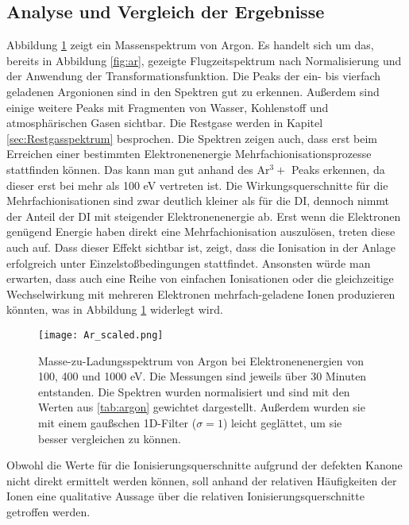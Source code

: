 \subsection{Analyse und Vergleich der Ergebnisse}
Abbildung \ref{fig:ar_scaled} zeigt ein Massenspektrum von Argon. Es handelt sich um das, bereits in Abbildung \ref{fig:ar}, gezeigte Flugzeitspektrum nach Normalisierung und der Anwendung der Transformationsfunktion. Die Peaks der ein- bis vierfach geladenen Argonionen sind in den Spektren gut zu erkennen. Außerdem sind einige weitere Peaks mit Fragmenten von Wasser, Kohlenstoff und atmosphärischen Gasen sichtbar. Die Restgase werden in Kapitel \ref{sec:Restgasspektrum} besprochen. Die Spektren zeigen auch, dass erst beim Erreichen einer bestimmten Elektronenenergie Mehrfachionisationsprozesse stattfinden können. Das kann man gut anhand des Ar$^3+$ Peaks erkennen, da dieser erst bei mehr als 100 eV vertreten ist. Die Wirkungsquerschnitte für die Mehrfachionisationen sind zwar deutlich kleiner als für die DI, dennoch nimmt der Anteil der DI mit steigender Elektronenenergie ab. Erst wenn die Elektronen genügend Energie haben direkt eine Mehrfachionisation auszulösen, treten diese auch auf. Dass dieser Effekt sichtbar ist, zeigt, dass die Ionisation in der Anlage erfolgreich unter Einzelstoßbedingungen stattfindet. Ansonsten würde man erwarten, dass auch eine Reihe von einfachen Ionisationen oder die gleichzeitige Wechselwirkung mit mehreren Elektronen mehrfach-geladene Ionen produzieren könnten, was in Abbildung \ref{fig:ar_scaled} widerlegt wird. 

\begin{landscape}
    \begin{figure}
        \centering
        \hspace*{-3cm}\texttt{[image: Ar\_scaled.png]}
        \caption[Skaliertes Massenspektrum von Argon bei verschiedenen Elektronenenergien]{Masse-zu-Ladungsspektrum von Argon bei Elektronenenergien von 100, 400 und 1000 eV. Die Messungen sind jeweils über 30 Minuten entstanden. Die Spektren wurden normalisiert und sind mit den Werten aus \ref{tab:argon} gewichtet dargestellt. Außerdem wurden sie mit einem gaußschen 1D-Filter ($\sigma = 1$) leicht geglättet, um sie besser vergleichen zu können.}
        \label{fig:ar_scaled}
    \end{figure}
\end{landscape}

Obwohl die Werte für die Ionisierungsquerschnitte aufgrund der defekten Kanone nicht direkt ermittelt werden können, soll anhand der relativen Häufigkeiten der Ionen eine qualitative Aussage über die relativen Ionisierungsquerschnitte getroffen werden. 

